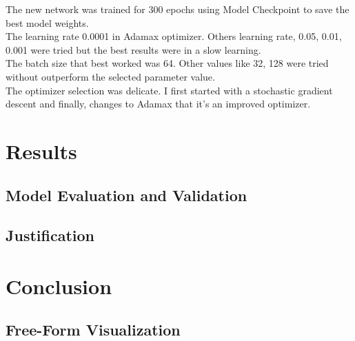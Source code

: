 \documentclass[a4paper,10pt]{article}
\begin{document}

The new network was trained for 300 epochs using Model Checkpoint to save the best model weights. \\

The learning rate 0.0001 in Adamax optimizer. Others learning rate, 0.05, 0.01, 0.001 were tried but the best results were in a slow learning. \\

The batch size that best worked was 64. Other values like 32, 128 were tried without outperform the selected parameter value.\\

The optimizer selection was delicate. I first started with a stochastic gradient descent and finally, changes to Adamax that it's an improved optimizer. \\

\section{Results}

\subsection{Model Evaluation and Validation}


\subsection{Justification}




\section{Conclusion}

\subsection{Free-Form Visualization}
\end{document}
